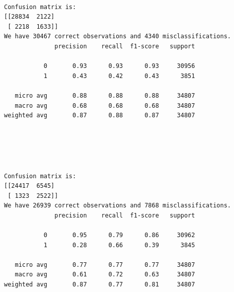 \documentclass[8pt,onecolumn,aps,pra]{revtex4-1}
\begin{document}
    \begin{center}
    \end{center}
    { \hspace*{\fill} \\}
    
    \begin{Verbatim}[commandchars=\\\{\}]
Confusion matrix is:
[[28834  2122]
 [ 2218  1633]]
We have 30467 correct observations and 4340 misclassifications.
              precision    recall  f1-score   support

           0       0.93      0.93      0.93     30956
           1       0.43      0.42      0.43      3851

   micro avg       0.88      0.88      0.88     34807
   macro avg       0.68      0.68      0.68     34807
weighted avg       0.87      0.88      0.87     34807


    \end{Verbatim}

    \begin{center}
    \end{center}
    { \hspace*{\fill} \\}
    
    \begin{center}
    \end{center}
    { \hspace*{\fill} \\}
    
    \begin{Verbatim}[commandchars=\\\{\}]
Confusion matrix is:
[[24417  6545]
 [ 1323  2522]]
We have 26939 correct observations and 7868 misclassifications.
              precision    recall  f1-score   support

           0       0.95      0.79      0.86     30962
           1       0.28      0.66      0.39      3845

   micro avg       0.77      0.77      0.77     34807
   macro avg       0.61      0.72      0.63     34807
weighted avg       0.87      0.77      0.81     34807


    \end{Verbatim}
\end{document}
